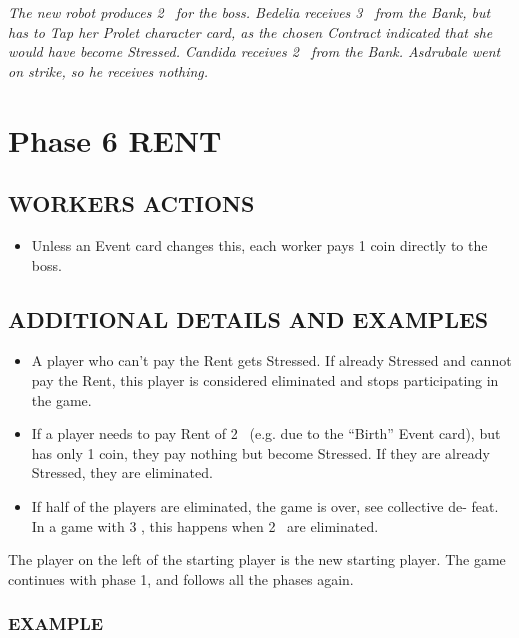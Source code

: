             \textit{The new robot produces 2 \faRubleSign\ for the boss. Bedelia receives 3 \faRubleSign\ from the Bank, but
            has to Tap her Prolet character card, as the chosen Contract indicated that she
            would have become Stressed. Candida receives 2 \faRubleSign\ from the Bank. Asdrubale went
            on strike, so he receives nothing.}



\section{Phase 6 RENT}

    \subsection{WORKERS ACTIONS}

        \begin{itemize}
            \item Unless an Event card changes this, each worker pays 1 coin directly to the
            boss.
        \end{itemize}
    
    \subsection{ADDITIONAL DETAILS AND EXAMPLES}

        \begin{itemize}
            \item A player who can't pay the Rent gets Stressed. If already Stressed and
            cannot pay the Rent, this player is considered eliminated and stops participating in the game.
            \item If a player needs to pay Rent of 2 \faRubleSign\ (e.g. due to the “Birth” Event card), but
            has only 1 coin, they pay nothing but become Stressed. If they are already
            Stressed, they are eliminated.
            \item If half of the players are eliminated, the game is over, see collective de-
            feat. In a game with 3 \faPeopleGroup, this happens when 2 \faPeopleGroup\ are eliminated.
        \end{itemize}
        The player on the left of the starting player is the new starting player. The game
        continues with phase 1, and follows all the phases again.


        \subsubsection{EXAMPLE}

